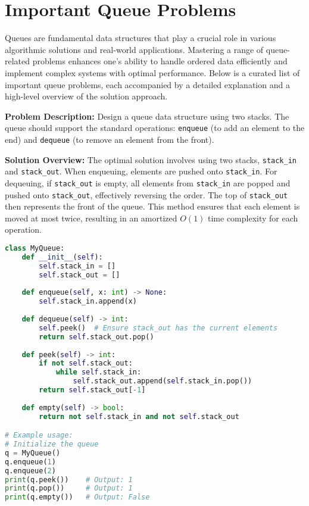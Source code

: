 
\section{Important Queue Problems}

Queues are fundamental data structures that play a crucial role in various algorithmic solutions and real-world applications. Mastering a range of queue-related problems enhances one's ability to handle ordered data efficiently and implement complex systems with optimal performance. Below is a curated list of important queue problems, each accompanied by a detailed explanation and a high-level overview of the solution approach.


\textbf{Problem Description:}  
Design a queue data structure using two stacks. The queue should support the standard operations: \texttt{enqueue} (to add an element to the end) and \texttt{dequeue} (to remove an element from the front).

\textbf{Solution Overview:}  
The optimal solution involves using two stacks, \texttt{stack\_in} and \texttt{stack\_out}. When enqueuing, elements are pushed onto \texttt{stack\_in}. For dequeuing, if \texttt{stack\_out} is empty, all elements from \texttt{stack\_in} are popped and pushed onto \texttt{stack\_out}, effectively reversing the order. The top of \texttt{stack\_out} then represents the front of the queue. This method ensures that each element is moved at most twice, resulting in an amortized \(O(1)\) time complexity for each operation.

\begin{fullwidth}
\begin{lstlisting}[language=Python]
class MyQueue:
    def __init__(self):
        self.stack_in = []
        self.stack_out = []
    
    def enqueue(self, x: int) -> None:
        self.stack_in.append(x)
    
    def dequeue(self) -> int:
        self.peek()  # Ensure stack_out has the current elements
        return self.stack_out.pop()
    
    def peek(self) -> int:
        if not self.stack_out:
            while self.stack_in:
                self.stack_out.append(self.stack_in.pop())
        return self.stack_out[-1]
    
    def empty(self) -> bool:
        return not self.stack_in and not self.stack_out

# Example usage:
# Initialize the queue
q = MyQueue()
q.enqueue(1)
q.enqueue(2)
print(q.peek())    # Output: 1
print(q.pop())     # Output: 1
print(q.empty())   # Output: False
\end{lstlisting}
\end{fullwidth}

